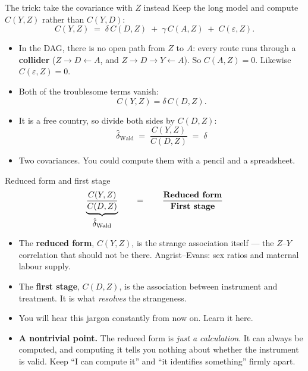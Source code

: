 \documentclass[
  11pt,
  ignorenonframetext,
  aspectratio=169,
]{beamer}
\providecommand{\tightlist}{%
  \setlength{\itemsep}{0pt}\setlength{\parskip}{0pt}}
\begin{document}
\begin{frame}{The trick: take the covariance with \(Z\) instead}
\protect{}\label{the-trick-take-the-covariance-with-z-instead}
Keep the long model and compute \(C(Y,Z)\) rather than \(C(Y,D)\): \[
C(Y,Z) \;=\; \delta\,C(D,Z) \;+\; \gamma\,C(A,Z) \;+\; C(\varepsilon,Z).
\]

\begin{itemize}
\tightlist
\item
  In the DAG, there is no open path from \(Z\) to \(A\): every route
  runs through a \textbf{collider} (\(Z \to D \leftarrow A\), and
  \(Z \to D \to Y \leftarrow A\)). So \(C(A,Z) = 0\). Likewise
  \(C(\varepsilon, Z) = 0\).
\item
  Both of the troublesome terms vanish: \[
  C(Y,Z) = \delta\,C(D,Z).
  \]
\item
  It is a free country, so divide both sides by \(C(D,Z)\): \[
  \boxed{\;\hat\delta_{\text{Wald}} \;=\; \frac{C(Y,Z)}{C(D,Z)} \;=\; \delta\;}
  \]
\item
  Two covariances. You could compute them with a pencil and a
  spreadsheet.
\end{itemize}
\end{frame}

\begin{frame}{Reduced form and first stage}
\protect{}\label{reduced-form-and-first-stage}
\[
\underbrace{\frac{C(Y,Z)}{C(D,Z)}}_{\textstyle \hat\delta_{\text{Wald}}}
\qquad=\qquad
\frac{\text{\textbf{Reduced form}}}{\text{\textbf{First stage}}}
\]

\begin{itemize}
\tightlist
\item
  The \textbf{reduced form}, \(C(Y,Z)\), is the strange association
  itself --- the \(Z\)--\(Y\) correlation that should not be there.
  Angrist--Evans: sex ratios and maternal labour supply.
\item
  The \textbf{first stage}, \(C(D,Z)\), is the association between
  instrument and treatment. It is what \emph{resolves} the strangeness.
\item
  You will hear this jargon constantly from now on. Learn it here.
\item
  \textbf{A nontrivial point.} The reduced form is \emph{just a
  calculation}. It can always be computed, and computing it tells you
  nothing about whether the instrument is valid. Keep ``I can compute
  it'' and ``it identifies something'' firmly apart.
\end{itemize}
\end{frame}
\end{document}
